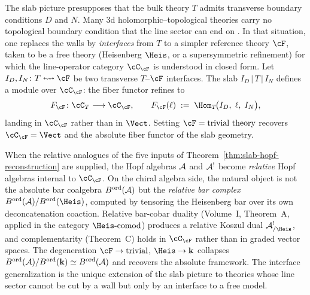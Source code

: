 \begin{remark}
\label{rem:dimofte-interface-generalization}
The slab picture presupposes that the bulk theory $T$ admits
transverse boundary conditions $D$ and $N$. Many 3d
holomorphic--topological theories carry no topological boundary
condition that the line sector can end on \cite{Dimofte25}.
In that situation, one replaces the walls by \emph{interfaces}
from $T$ to a simpler reference theory $\cF$, taken to be a free
theory (Heisenberg $\Heis$, or a supersymmetric refinement) for
which the line-operator category $\cC_\cF$ is understood in closed
form. Let $I_D, I_N \colon T \leftrightsquigarrow \cF$ be two
transverse $T$--$\cF$ interfaces. The slab
$I_D \,|\, T \,|\, I_N$ defines a module over $\cC_\cF$: the
fiber functor refines to
\[
 F_\cF \colon \cC_T \longrightarrow \cC_\cF,
 \qquad
 F_\cF(\ell)
 \;:=\;
 \Hom_T\!\bigl(I_D,\; \ell,\; I_N\bigr),
\]
landing in $\cC_\cF$ rather than in $\Vect$. Setting
$\cF = \text{trivial theory}$ recovers $\cC_\cF = \Vect$ and the
absolute fiber functor of the slab geometry.

When the relative analogues of the five inputs of
Theorem~\ref{thm:slab-hopf-reconstruction} are supplied, the Hopf
algebras $\mathcal{A}$ and $\mathcal{A}^!$ become \emph{relative} Hopf algebras
internal to $\cC_\cF$. On the chiral algebra side, the
natural object is not the absolute bar coalgebra
$B^{\mathrm{ord}}(\mathcal{A})$ but the \emph{relative bar complex}
$B^{\mathrm{ord}}(\cA)/B^{\mathrm{ord}}(\Heis)$, computed by
tensoring the Heisenberg bar over its own deconcatenation coaction.
Relative bar-cobar duality (Volume~I, Theorem~A, applied in the
category $\Heis\text{-}\mathrm{comod}$) produces a relative Koszul
dual $\cA^!_{/\Heis}$, and complementarity (Theorem~C) holds in
$\cC_\cF$ rather than in graded vector spaces. The degeneration
$\cF \to \text{trivial}$, $\Heis \to \mathbf{k}$ collapses
$B^{\mathrm{ord}}(\mathcal{A})/B^{\mathrm{ord}}(\mathbf{k})
\simeq B^{\mathrm{ord}}(\mathcal{A})$ and recovers the absolute framework.
The interface generalization is the unique extension of the slab
picture to theories whose line sector cannot be cut by a wall but
only by an interface to a free model.
\end{remark}


